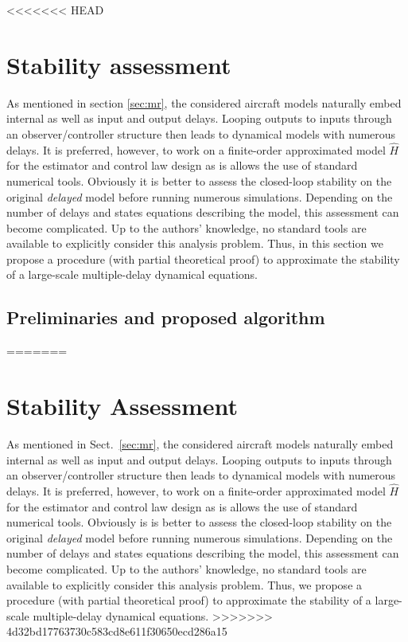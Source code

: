 \documentclass[graybox]{svmult}
\begin{document}
<<<<<<< HEAD
\section{Stability assessment}\label{sec:st}

As mentioned in section \ref{sec:mr}, the considered aircraft models naturally embed internal as well as input and output delays. Looping outputs to inputs through an observer/controller structure then leads to dynamical models with  numerous delays. It is preferred, however, to work on a finite-order approximated model $\hat H$ for the estimator and control law design as is allows the use of standard numerical tools. Obviously it is better to assess the closed-loop stability on the original \textit{delayed} model before running numerous simulations.
Depending on the number of delays and states equations describing the model, this assessment can become complicated. Up to the authors' knowledge, no  standard tools are available to explicitly consider this analysis problem. Thus, in this section we propose a procedure (with partial theoretical proof) to approximate the stability of a large-scale multiple-delay dynamical equations. 

\subsection{Preliminaries and proposed algorithm }
=======
\section{Stability Assessment}\label{sec:st}\vspace{-1mm}
As mentioned in Sect.~\ref{sec:mr}, the considered aircraft models naturally embed internal as well as input and output delays. Looping outputs to inputs through an observer/controller structure then leads to dynamical models with  numerous delays. It is preferred, however, to work on a finite-order approximated model $\hat H$ for the estimator and control law design as is allows the use of standard numerical tools. Obviously is is better to assess the closed-loop stability on the original \textit{delayed} model before running numerous simulations.
Depending on the number of delays and states equations describing the model, this assessment can become complicated. Up to the authors' knowledge, no  standard tools are available to explicitly consider this analysis problem. Thus, we propose a procedure (with partial theoretical proof) to approximate the stability of a large-scale multiple-delay dynamical equations. \vspace{-1mm}
>>>>>>> 4d32bd17763730c583cd8e611f30650ecd286a15
\end{document}
